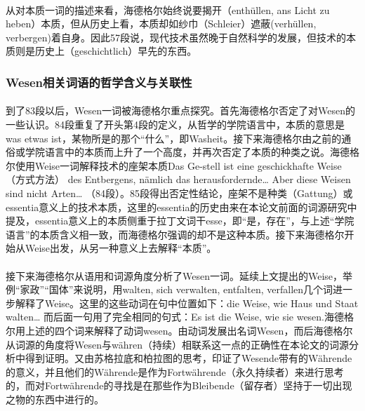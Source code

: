 \documentclass{article}
\begin{document}
			\paragraph{}
		从对本质一词的描述来看，海德格尔始终说要揭开（enthüllen, ans Licht zu heben）本质，但从历史上看，本质却如纱巾（Schleier）遮蔽(verhüllen, verbergen)着自身。因此57段说，现代技术虽然晚于自然科学的发展，但技术的本质则是历史上（geschichtlich）早先的东西。
			\paragraph{}
		
		\subsubsection{Wesen相关词语的哲学含义与关联性}
			\paragraph{}
		到了83段以后，Wesen一词被海德格尔重点探究。首先海德格尔否定了对Wesen的一些认识。84段重复了开头第4段的定义，从哲学的学院语言中，本质的意思是was etwas ist，某物所是的那个“什么”，即Washeit。接下来海德格尔由之前的通俗或学院语言中的本质而上升了一个高度，并再次否定了本质的种类之说。海德格尔使用Weise一词解释技术的座架本质Das Ge-stell ist eine geschickhafte Weise（方式方法） des Entbergens, nämlich das herausfordernde… Aber diese Weisen sind nicht Arten… （84段）。85段得出否定性结论，座架不是种类（Gattung）或essentia意义上的技术本质，这里的essentia的历史由来在本论文前面的词源研究中提及，essentia意义上的本质侧重于拉丁文词干esse，即“是，存在”，与上述“学院语言”的本质含义相一致，而海德格尔强调的却不是这种本质。接下来海德格尔开始从Weise出发，从另一种意义上去解释“本质”。
			\paragraph{}
		接下来海德格尔从语用和词源角度分析了Wesen一词。延续上文提出的Weise，举例“家政”“国体”来说明，用walten, sich verwalten, entfalten, verfallen几个词进一步解释了Weise。这里的这些动词在句中位置如下：die Weise, wie Haus und Staat walten… 而后面一句用了完全相同的句式：Es ist die Weise, wie sie wesen.海德格尔用上述的四个词来解释了动词wesen。由动词发展出名词Wesen，而后海德格尔从词源的角度将Wesen与währen（持续）相联系这一点的正确性在本论文的词源分析中得到证明。又由苏格拉底和柏拉图的思考，印证了Wesende带有的Währende的意义，并且他们的Währende是作为Fortwährende（永久持续者）来进行思考的，而对Fortwährende的寻找是在那些作为Bleibende（留存者）坚持于一切出现之物的东西中进行的。
\end{document}
